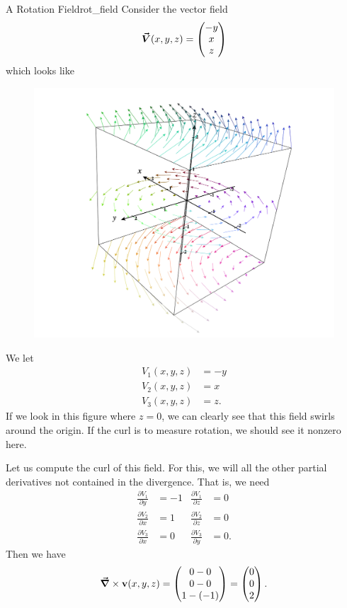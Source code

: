 		        \begin{ex}{A Rotation Field}{rot_field}
		        Consider the vector field
		        \[
		        \boldsymbol{\vec{V}}(x,y,z) = \begin{pmatrix} -y \\ x \\ z\end{pmatrix}
		        \]
		        which looks like
		        \begin{figure}[H]
		            \centering
		            \includegraphics[width=.6\textwidth]{Figures_Part_6/curl_field.png}
		        \end{figure}
		        We let
		        \begin{align*}
		            V_1(x,y,z) &= -y\\
		            V_2(x,y,z) &= x\\
		            V_3(x,y,z) &= z.
		        \end{align*}
		        If we look in this figure where $z=0$, we can clearly see that this field swirls around the origin.  If the curl is to measure rotation, we should see it nonzero here.

		        Let us compute the curl of this field.  For this, we will all the other partial derivatives not contained in the divergence. That is, we need
		        \begin{align*}
		            \frac{\partial V_1}{\partial y} &= -1 & \frac{\partial V_1}{\partial z} &= 0\\
		            \frac{\partial V_2}{\partial x} &= 1& \frac{\partial V_2}{\partial z} &= 0\\
		            \frac{\partial V_3}{\partial x} &= 0 &  \frac{\partial V_3}{\partial y} &=0.
		        \end{align*}
		        Then we have
		        \[
		        \boldsymbol{\vec{\nabla}} \times \mathbf{v}(x,y,z) = \begin{pmatrix} 0-0\\ 0-0 \\ 1-(-1)\end{pmatrix} = \begin{pmatrix} 0\\ 0 \\ 2\end{pmatrix}.
		        \]


\end{ex}
